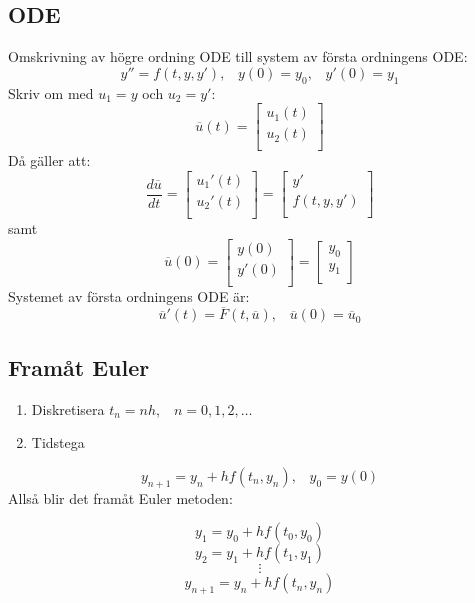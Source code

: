 \documentclass[a4paper,11pt]{article}
\begin{document}
\subsection{ODE}
Omskrivning av högre ordning ODE till system av första ordningens ODE:
\[
y'' = f(t, y, y'), \hspace{10pt} y(0) = y_0, \hspace{10pt} y'(0) = y_1
\]
Skriv om med $u_1 = y$ och $u_2 = y'$:
\[
\overline{u}(t) = \begin{bmatrix}
    u_1(t) \\
    u_2(t) \\
\end{bmatrix}
\]
Då gäller att:
\[
\frac{d\overline{u}}{dt} = 
\begin{bmatrix}
    u_1'(t) \\
    u_2'(t)\\
\end{bmatrix} = 
\begin{bmatrix}
    y' \\
    f(t, y, y') \\
\end{bmatrix}
\]
samt \[
\overline{u}(0) = \begin{bmatrix}
    y(0) \\
    y'(0) \\
\end{bmatrix} = \begin{bmatrix}
    y_0 \\
    y_1 \\
\end{bmatrix}
\]
Systemet av första ordningens ODE är:
\[\overline{u}'(t) = \overline{F}(t, \overline{u}), \hspace{10pt} \overline{u}(0) = \overline{u}_0\]

\subsection{Framåt Euler}
\begin{enumerate}
    \item Diskretisera $t_n = nh, \hspace{10pt} n = 0, 1, 2, \ldots$
    \item Tidstega
\end{enumerate}

\[
y_{n+1} = y_n + hf(t_n, y_n), \hspace{10pt} y_0 = y(0)
\]
Allså blir det framåt Euler metoden:

$$y_{1} = y_0 + hf(t_0, y_0)$$
$$y_{2} = y_1 + hf(t_1, y_1)$$
$$\vdots$$
$$y_{n+1} = y_n + hf(t_n, y_n)$$
\end{document}
